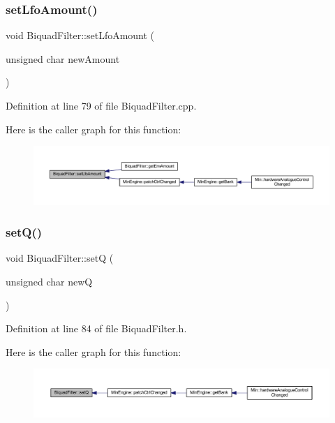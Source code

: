 \subsubsection{\texorpdfstring{set\+Lfo\+Amount()}{setLfoAmount()}}
{\footnotesize\ttfamily void Biquad\+Filter\+::set\+Lfo\+Amount (\begin{DoxyParamCaption}\item[{unsigned char}]{new\+Amount }\end{DoxyParamCaption})}



Definition at line 79 of file Biquad\+Filter.\+cpp.

Here is the caller graph for this function\+:
\nopagebreak
\begin{figure}[H]
\begin{center}
\leavevmode
\includegraphics[width=350pt]{class_biquad_filter_a57c5069dadf75d44783a2fb20dadfbc4_icgraph}
\end{center}
\end{figure}
\mbox{\label{class_biquad_filter_adc19385e7684fe4660b4d1f2e433fa00}} 
\subsubsection{\texorpdfstring{set\+Q()}{setQ()}}
{\footnotesize\ttfamily void Biquad\+Filter\+::setQ (\begin{DoxyParamCaption}\item[{unsigned char}]{newQ }\end{DoxyParamCaption})\hspace{0.3cm}{\ttfamily [inline]}}



Definition at line 84 of file Biquad\+Filter.\+h.

Here is the caller graph for this function\+:
\nopagebreak
\begin{figure}[H]
\begin{center}
\leavevmode
\includegraphics[width=350pt]{class_biquad_filter_adc19385e7684fe4660b4d1f2e433fa00_icgraph}
\end{center}
\end{figure}
\mbox{\label{class_biquad_filter_af31a36e9f121facbabf87d303642d4e2}} 
